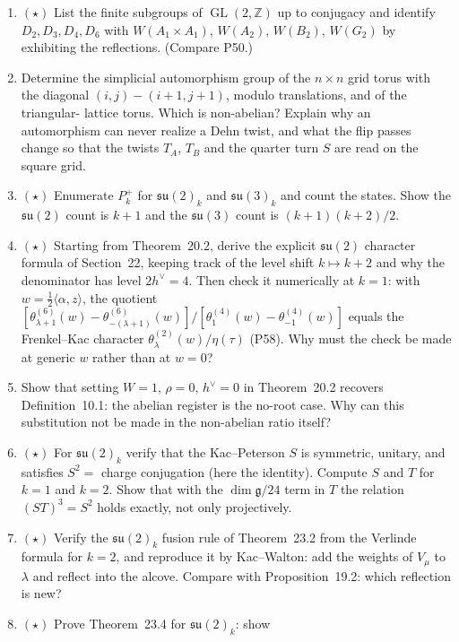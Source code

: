 \documentclass[11pt]{article}
\newcommand{\Z}{\mathbb{Z}}
\newcommand{\GL}{\operatorname{GL}}
\begin{document}
\begin{enumerate}[label=\textbf{P\arabic*.},leftmargin=*,start=59]
\item $(\star)$ List the finite subgroups of $\GL(2,\Z)$ up to conjugacy and
  identify $D_2,D_3,D_4,D_6$ with $W(A_1\times A_1)$, $W(A_2)$, $W(B_2)$,
  $W(G_2)$ by exhibiting the reflections. (Compare P50.)
\item Determine the simplicial automorphism group of the $n\times n$ grid
  torus with the diagonal $(i,j)\!-\!(i{+}1,j{+}1)$, modulo translations, and of the triangular-
  lattice torus. Which is non-abelian? Explain why an automorphism can never
  realize a Dehn twist, and what the flip passes change so that the twists
  $T_A$, $T_B$ and the quarter turn $S$ are read on the square grid.
\item $(\star)$ Enumerate $P_k^+$ for $\mathfrak{su}(2)_k$ and
  $\mathfrak{su}(3)_k$ and count the states. Show the $\mathfrak{su}(2)$ count
  is $k+1$ and the $\mathfrak{su}(3)$ count is $(k+1)(k+2)/2$.
\item $(\star)$ Starting from Theorem~20.2, derive the explicit
  $\mathfrak{su}(2)$ character formula of Section~22, keeping
  track of the level shift $k\mapsto k+2$ and why the denominator has level
  $2h^\vee = 4$. Then check it numerically at $k = 1$: with $w = \tfrac12\langle\alpha,z\rangle$,
  the quotient $[\theta^{(6)}_{\lambda+1}(w)-\theta^{(6)}_{-(\lambda+1)}(w)]/[\theta^{(4)}_1(w)-\theta^{(4)}_{-1}(w)]$
  equals the Frenkel--Kac character $\theta^{(2)}_\lambda(w)/\eta(\tau)$
  (P58). Why must the check be made at generic $w$ rather than at $w = 0$?
\item Show that setting $W = 1$, $\rho = 0$, $h^\vee = 0$ in
  Theorem~20.2 recovers Definition~10.1: the abelian
  register is the no-root case. Why can this substitution not be made in
  the non-abelian ratio itself?
\item $(\star)$ For $\mathfrak{su}(2)_k$ verify that the Kac--Peterson $S$ is
  symmetric, unitary, and satisfies $S^2 = $ charge conjugation (here the
  identity). Compute $S$ and $T$ for $k = 1$ and $k = 2$. Show that with the
  $\dim\mathfrak g/24$ term in $T$ the relation $(ST)^3 = S^2$ holds exactly,
  not only projectively.
\item $(\star)$ Verify the $\mathfrak{su}(2)_k$ fusion rule of
  Theorem~23.2 from the Verlinde formula for $k = 2$, and
  reproduce it by Kac--Walton: add the weights of $V_\mu$ to $\lambda$ and
  reflect into the alcove. Compare with Proposition~19.2: which
  reflection is new?
\item $(\star)$ Prove Theorem~23.4 for $\mathfrak{su}(2)_k$: show

\end{enumerate}
\end{document}
